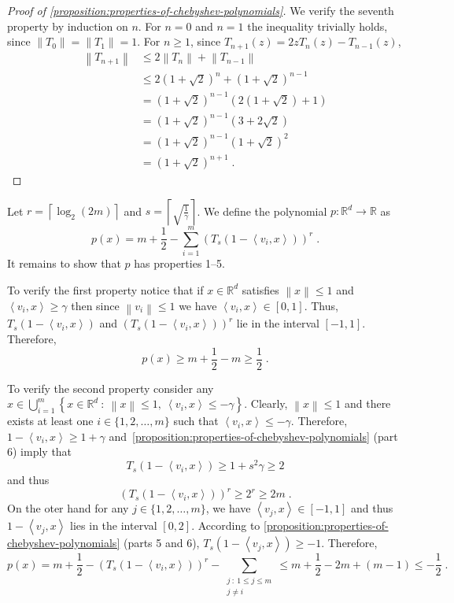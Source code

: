 \documentclass[12pt]{article}
\newcommand{\R}{\mathbb{R}}  %
\newcommand{\ip}[2]{\left\langle #1, #2 \right\rangle} %
\newcommand{\norm}[1]{\left\| #1 \right\|}  %
\begin{document}
\begin{proof}[Proof of \autoref{proposition:properties-of-chebyshev-polynomials}]
We verify the seventh property by induction on $n$.
For $n=0$ and $n=1$ the inequality trivially holds, since $\norm{T_0} = \norm{T_1} = 1$.
For $n \ge 1$, since $T_{n+1}(z) = 2zT_n(z) - T_{n-1}(z)$,
\begin{align*}
\norm{T_{n+1}}
& \le 2 \norm{T_n} + \norm{T_{n-1}} \\
& \le 2 (1 + \sqrt{2})^n + (1 + \sqrt{2})^{n-1} \\
& = (1 + \sqrt{2})^{n-1} (2 (1 + \sqrt{2}) + 1) \\
& = (1 + \sqrt{2})^{n-1} (3 + 2\sqrt{2}) \\
& = (1 + \sqrt{2})^{n-1} (1 + \sqrt{2})^2 \\
& = (1 + \sqrt{2})^{n+1} \; .
\end{align*}

\end{proof}

Let $r = \left\lceil \log_2(2m) \right\rceil$ and $s = \left\lceil \sqrt{\frac{1}{\gamma}} \right\rceil$.
We define the polynomial $p:\R^d \to \R$ as
$$
p(x) = m + \frac{1}{2} - \sum_{i=1}^m \left( T_s(1 - \ip{v_i}{x}) \right)^r \; .
$$
It remains to show that $p$ has properties 1--5.

To verify the first property notice that if $x \in \R^d$ satisfies $\norm{x} \le
1$ and $\ip{v_i}{x} \ge \gamma$ then since $\norm{v_i} \le 1$ we have
$\ip{v_i}{x} \in [0,1]$. Thus, $T_s(1 - \ip{v_i}{x})$ and $\left( T_s(1 -
\ip{v_i}{x}) \right)^r$ lie in the interval $[-1,1]$. Therefore,
$$
p(x) \ge m + \frac{1}{2} - m \ge \frac{1}{2} \; .
$$

To verify the second property consider any $x \in \bigcup_{i=1}^m \left\{ x \in \R^d
~:~ \norm{x} \le 1, \ \ip{v_i}{x} \le - \gamma \right\}$. Clearly, $\norm{x} \le 1$
and there exists at least one $i \in \{1,2,\dots,m\}$ such that $\ip{v_i}{x} \le
- \gamma$. Therefore, $1 - \ip{v_i}{x} \ge 1 + \gamma$ and~\autoref{proposition:properties-of-chebyshev-polynomials} (part 6)
imply that
$$
T_s(1 - \ip{v_i}{x}) \ge 1 + s^2 \gamma \ge 2
$$
and thus
$$
\left( T_s(1 - \ip{v_i}{x}) \right)^r \ge 2^r \ge 2m \; .
$$
On the oter hand for any $j \in \{1,2,\dots,m\}$, we have $\ip{v_j}{x} \in
[-1,1]$ and thus $1 - \ip{v_j}{x}$ lies in the interval $[0,2]$. According to
\autoref{proposition:properties-of-chebyshev-polynomials} (parts 5 and 6), $T_s(1 - \ip{v_j}{x})
\ge -1$. Therefore,
$$
p(x) = m + \frac{1}{2} - \left( T_s(1 - \ip{v_i}{x}) \right)^r - \sum_{\substack{j ~:~  1 \le j \le m \\ j \neq i}} \le m + \frac{1}{2} - 2m + (m - 1) \le - \frac{1}{2} \; .
$$
\end{document}
